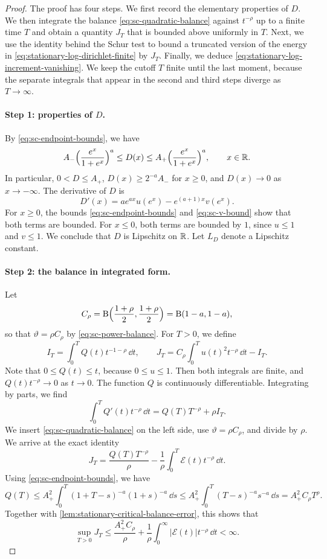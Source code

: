 \begin{proof}
The proof has four steps. We first record the elementary properties of $D$. We then integrate the balance \eqref{eq:sc-quadratic-balance} against $t^{-\rho}$ up to a finite time $T$ and obtain a quantity $J_T$ that is bounded above uniformly in $T$. Next, we use the identity behind the Schur test to bound a truncated version of the energy in \eqref{eq:stationary-log-dirichlet-finite} by $J_T$. Finally, we deduce \eqref{eq:stationary-log-increment-vanishing}. We keep the cutoff $T$ finite until the last moment, because the separate integrals that appear in the second and third steps diverge as $T\to\infty$.

\paragraph{Step 1: properties of $D$.} By \eqref{eq:sc-endpoint-bounds}, we have
\[
 A_-\Bigl(\frac{e^x}{1+e^x}\Bigr)^a\le D(x)\le A_+\Bigl(\frac{e^x}{1+e^x}\Bigr)^a,\qquad x\in\mathbb R .
\]
In particular, $0<D\le A_+$, $D(x)\ge2^{-a}A_-$ for $x\ge0$, and $D(x)\to0$ as $x\to-\infty$. The derivative of $D$ is
\[
 D'(x)=ae^{ax}u(e^x)-e^{(a+1)x}v(e^x).
\]
For $x\ge0$, the bounds \eqref{eq:sc-endpoint-bounds} and \eqref{eq:sc-v-bound} show that both terms are bounded. For $x\le0$, both terms are bounded by $1$, since $u\le1$ and $v\le1$. We conclude that $D$ is Lipschitz on $\mathbb R$. Let $L_D$ denote a Lipschitz constant.

\paragraph{Step 2: the balance in integrated form.} Let
\[
 C_\rho=\mathrm B\Bigl(\frac{1+\rho}2,\frac{1+\rho}2\Bigr)=\mathrm B(1-a,1-a),
\]
so that $\vartheta=\rho C_\rho$ by \eqref{eq:sc-power-balance}. For $T>0$, we define
\[
 I_T=\int_0^TQ(t)t^{-1-\rho}\,\dd t,
 \qquad
 J_T=C_\rho\int_0^T u(t)^2t^{-\rho}\,\dd t-I_T.
\]
Note that $0\le Q(t)\le t$, because $0\le u\le1$. Then both integrals are finite, and $Q(t)t^{-\rho}\to0$ as $t\to0$. The function $Q$ is continuously differentiable. Integrating by parts, we find
\[
 \int_0^TQ'(t)t^{-\rho}\,\dd t=Q(T)T^{-\rho}+\rho I_T .
\]
We insert \eqref{eq:sc-quadratic-balance} on the left side, use $\vartheta=\rho C_\rho$, and divide by $\rho$. We arrive at the exact identity
\begin{equation}
 J_T=\frac{Q(T)T^{-\rho}}\rho
       -\frac1\rho\int_0^T\mathcal E(t)t^{-\rho}\,\dd t.
 \label{eq:sc-Schur-deficit}
\end{equation}
Using \eqref{eq:sc-endpoint-bounds}, we have
\[
 Q(T)\le A_+^2\int_0^T(1+T-s)^{-a}(1+s)^{-a}\,\dd s\le A_+^2\int_0^T(T-s)^{-a}s^{-a}\,\dd s=A_+^2C_\rho T^{\rho}.
\]
Together with \cref{lem:stationary-critical-balance-error}, this shows that
\[
 \sup_{T>0}J_T\le\frac{A_+^2C_\rho}\rho+\frac1\rho\int_0^\infty|\mathcal E(t)|t^{-\rho}\,\dd t<\infty .
\]


\end{proof}
